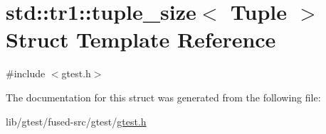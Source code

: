 \hypertarget{structstd_1_1tr1_1_1tuple__size}{\section{std\-:\-:tr1\-:\-:tuple\-\_\-size$<$ Tuple $>$ Struct Template Reference}
\label{structstd_1_1tr1_1_1tuple__size}
}


{\ttfamily \#include $<$gtest.\-h$>$}



The documentation for this struct was generated from the following file\-:\begin{DoxyCompactItemize}
\item 
lib/gtest/fused-\/src/gtest/\hyperlink{fused-src_2gtest_2gtest_8h}{gtest.\-h}\end{DoxyCompactItemize}
